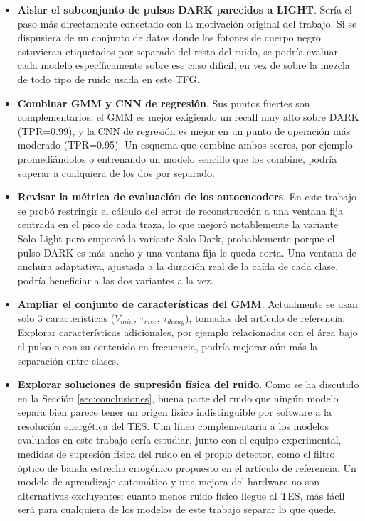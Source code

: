 \begin{itemize}
	\item \textbf{Aislar el subconjunto de pulsos DARK parecidos a LIGHT}. Sería el paso más directamente conectado con la motivación original del trabajo. Si se dispusiera de un conjunto de datos donde los fotones de cuerpo negro estuvieran etiquetados por separado del resto del ruido, se podría evaluar cada modelo específicamente sobre ese caso difícil, en vez de sobre la mezcla de todo tipo de ruido usada en este TFG.

	\item \textbf{Combinar GMM y CNN de regresión}. Sus puntos fuertes son complementarios: el GMM es mejor exigiendo un recall muy alto sobre DARK (TPR=0.99), y la CNN de regresión es mejor en un punto de operación más moderado (TPR=0.95). Un esquema que combine ambos scores, por ejemplo promediándolos o entrenando un modelo sencillo que los combine, podría superar a cualquiera de los dos por separado.

	\item \textbf{Revisar la métrica de evaluación de los autoencoders}. En este trabajo se probó restringir el cálculo del error de reconstrucción a una ventana fija centrada en el pico de cada traza, lo que mejoró notablemente la variante Solo Light pero empeoró la variante Solo Dark, probablemente porque el pulso DARK es más ancho y una ventana fija le queda corta. Una ventana de anchura adaptativa, ajustada a la duración real de la caída de cada clase, podría beneficiar a las dos variantes a la vez.

	\item \textbf{Ampliar el conjunto de características del GMM}. Actualmente se usan solo 3 características ($V_{min}$, $\tau_{rise}$, $\tau_{decay}$), tomadas del artículo de referencia. Explorar características adicionales, por ejemplo relacionadas con el área bajo el pulso o con su contenido en frecuencia, podría mejorar aún más la separación entre clases.

	\item \textbf{Explorar soluciones de supresión física del ruido}. Como se ha discutido en la Sección \ref{sec:conclusiones}, buena parte del ruido que ningún modelo separa bien parece tener un origen físico indistinguible por software a la resolución energética del TES. Una línea complementaria a los modelos evaluados en este trabajo sería estudiar, junto con el equipo experimental, medidas de supresión física del ruido en el propio detector, como el filtro óptico de banda estrecha criogénico propuesto en el artículo de referencia. Un modelo de aprendizaje automático y una mejora del hardware no son alternativas excluyentes: cuanto menos ruido físico llegue al TES, más fácil será para cualquiera de los modelos de este trabajo separar lo que quede.
\end{itemize}


